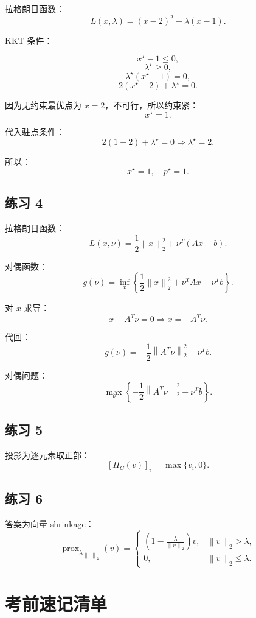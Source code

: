 \documentclass[11pt,a4paper]{ctexart}
\newcommand{\prox}{\operatorname{prox}}
\newcommand{\norm}[1]{\left\lVert #1 \right\rVert}
\theoremstyle{definition}
\theoremstyle{plain}
\theoremstyle{remark}
\begin{document}
拉格朗日函数：
\[
    L(x,\lambda)=(x-2)^2+\lambda(x-1).
\]

KKT 条件：

\[
    x^\star-1\le0,
\]
\[
    \lambda^\star\ge0,
\]
\[
    \lambda^\star(x^\star-1)=0,
\]
\[
    2(x^\star-2)+\lambda^\star=0.
\]

因为无约束最优点为 $x=2$，不可行，所以约束紧：
\[
    x^\star=1.
\]

代入驻点条件：
\[
    2(1-2)+\lambda^\star=0
    \Rightarrow
    \lambda^\star=2.
\]

所以：
\[
    x^\star=1,\quad p^\star=1.
\]

\subsection*{练习 4}

拉格朗日函数：
\[
    L(x,\nu)=\frac12\norm{x}_2^2+\nu^T(Ax-b).
\]

对偶函数：
\[
    g(\nu)=\inf_x
    \left\{
    \frac12\norm{x}_2^2+\nu^T A x-\nu^T b
    \right\}.
\]

对 $x$ 求导：
\[
    x+A^T\nu=0
    \Rightarrow
    x=-A^T\nu.
\]

代回：
\[
    g(\nu)
    =
    -\frac12\norm{A^T\nu}_2^2-\nu^Tb.
\]

对偶问题：
\[
    \max_\nu
    \left\{
    -\frac12\norm{A^T\nu}_2^2-\nu^Tb
    \right\}.
\]

\subsection*{练习 5}

投影为逐元素取正部：
\[
    [\Pi_C(v)]_i=\max\{v_i,0\}.
\]

\subsection*{练习 6}

答案为向量 shrinkage：
\[
    \prox_{\lambda \norm{\cdot}_2}(v)
    =
    \begin{cases}
    \left(1-\frac{\lambda}{\norm{v}_2}\right)v,
    & \norm{v}_2>\lambda,\\
    0,
    & \norm{v}_2\le\lambda.
    \end{cases}
\]

\section{考前速记清单}
\end{document}
